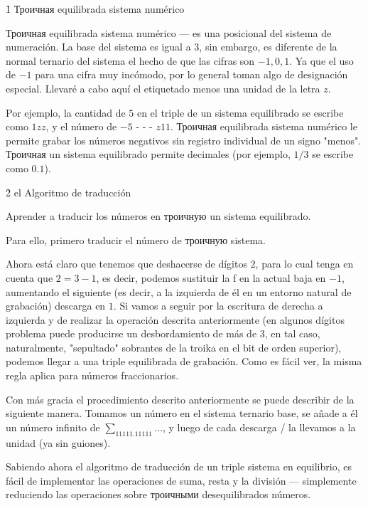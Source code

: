 \h1{ Троичная equilibrada sistema numérico }

Троичная equilibrada sistema numérico --- es una posicional del sistema de numeración. La base del sistema es igual a $3$, sin embargo, es diferente de la normal ternario del sistema el hecho de que las cifras son $-1, 0, 1$. Ya que el uso de $-1$ para una cifra muy incómodo, por lo general toman algo de designación especial. Llevaré a cabo aquí el etiquetado menos una unidad de la letra $z$.

Por ejemplo, la cantidad de $5$ en el triple de un sistema equilibrado se escribe como $1zz$, y el número de $-5$ - - - $z11$. Троичная equilibrada sistema numérico le permite grabar los números negativos sin registro individual de un signo "menos". Троичная un sistema equilibrado permite decimales (por ejemplo, $1/3$ se escribe como $0.1$).

\h2{ el Algoritmo de traducción }

Aprender a traducir los números en троичную un sistema equilibrado.

Para ello, primero traducir el número de троичную sistema.

Ahora está claro que tenemos que deshacerse de dígitos $2$, para lo cual tenga en cuenta que $2 = 3 - 1$, es decir, podemos sustituir la f en la actual baja en $-1$, aumentando el siguiente (es decir, a la izquierda de él en un entorno natural de grabación) descarga en $1$. Si vamos a seguir por la escritura de derecha a izquierda y de realizar la operación descrita anteriormente (en algunos dígitos problema puede producirse un desbordamiento de más de $3$, en tal caso, naturalmente, "sepultado" sobrantes de la troika en el bit de orden superior), podemos llegar a una triple equilibrada de grabación. Como es fácil ver, la misma regla aplica para números fraccionarios.

Con más gracia el procedimiento descrito anteriormente se puede describir de la siguiente manera. Tomamos un número en el sistema ternario base, se añade a él un número infinito de $\sum_ 11111.11111 \ldots$, y luego de cada descarga / la llevamos a la unidad (ya sin guiones).

Sabiendo ahora el algoritmo de traducción de un triple sistema en equilibrio, es fácil de implementar las operaciones de suma, resta y la división --- simplemente reduciendo las operaciones sobre троичными desequilibrados números.